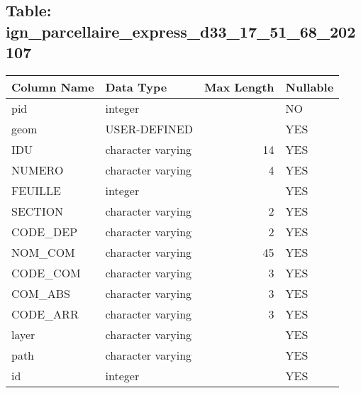 \subsection*{Table: ign_parcellaire_express_d33_17_51_68_202107}
\begin{tabular}{llrl}
\hline
 Column Name   & Data Type         &   Max Length & Nullable   \\
\hline
 pid           & integer           &              & NO         \\
 geom          & USER-DEFINED      &              & YES        \\
 IDU           & character varying &           14 & YES        \\
 NUMERO        & character varying &            4 & YES        \\
 FEUILLE       & integer           &              & YES        \\
 SECTION       & character varying &            2 & YES        \\
 CODE_DEP      & character varying &            2 & YES        \\
 NOM_COM       & character varying &           45 & YES        \\
 CODE_COM      & character varying &            3 & YES        \\
 COM_ABS       & character varying &            3 & YES        \\
 CODE_ARR      & character varying &            3 & YES        \\
 layer         & character varying &              & YES        \\
 path          & character varying &              & YES        \\
 id            & integer           &              & YES        \\
\hline
\end{tabular}
